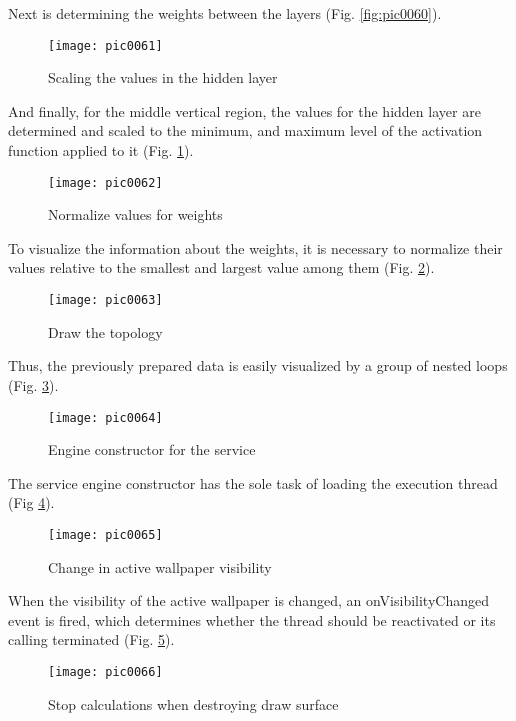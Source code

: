 Next is determining the weights between the layers (Fig. \ref{fig:pic0060}).

\begin{figure}[h]
\centering
\texttt{[image: pic0061]}
\caption{Scaling the values in the hidden layer}
\label{fig:pic0061}
\end{figure}
\FloatBarrier

And finally, for the middle vertical region, the values for the hidden layer are determined and scaled to the minimum, and maximum level of the activation function applied to it (Fig. \ref{fig:pic0061}).

\begin{figure}[h]
\centering
\texttt{[image: pic0062]}
\caption{Normalize values for weights}
\label{fig:pic0062}
\end{figure}
\FloatBarrier

To visualize the information about the weights, it is necessary to normalize their values relative to the smallest and largest value among them (Fig. \ref{fig:pic0062}).

\begin{figure}[h]
\centering
\texttt{[image: pic0063]}
\caption{Draw the topology}
\label{fig:pic0063}
\end{figure}
\FloatBarrier

Thus, the previously prepared data is easily visualized by a group of nested loops (Fig. \ref{fig:pic0063}).

\begin{figure}[h]
\centering
\texttt{[image: pic0064]}
\caption{Engine constructor for the service}
\label{fig:pic0064}
\end{figure}
\FloatBarrier

The service engine constructor has the sole task of loading the execution thread (Fig \ref{fig:pic0064}).

\begin{figure}[h]
\centering
\texttt{[image: pic0065]}
\caption{Change in active wallpaper visibility}
\label{fig:pic0065}
\end{figure}
\FloatBarrier

When the visibility of the active wallpaper is changed, an onVisibilityChanged event is fired, which determines whether the thread should be reactivated or its calling terminated (Fig. \ref{fig:pic0065}).

\begin{figure}[h]
\centering
\texttt{[image: pic0066]}
\caption{Stop calculations when destroying draw surface}
\label{fig:pic0066}
\end{figure}
\FloatBarrier


